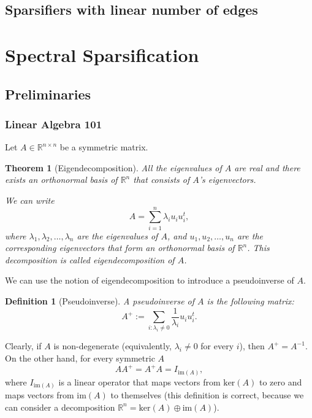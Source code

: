 \documentclass[12pt]{article}
\newtheorem{theorem}{Theorem}
\newtheorem{definition}{Definition}
\begin{document}
    \subsection{Sparsifiers with linear number of edges}
    \cite{BSS09}

    \section{Spectral Sparsification}

    \subsection{Preliminaries}

    \subsubsection{Linear Algebra 101}

    Let $A \in \mathbb{R}^{n \times n}$ be a symmetric matrix. 
    \begin{theorem}[Eigendecomposition]
        All the eigenvalues
        of $A$ are real and there exists an orthonormal basis of $\mathbb{R}^n$
        that consists of $A$'s eigenvectors.

        We can write
        $$
            A = \sum_{i=1}^n \lambda_i u_i u_i^t,
        $$
        where $\lambda_1, \lambda_2, \ldots, \lambda_n$ are the eigenvalues of $A$, and
        $u_1, u_2, \ldots, u_n$ are the corresponding eigenvectors that form an orthonormal
        basis of $\mathbb{R}^n$. This decomposition is called \emph{eigendecomposition}
        of $A$.
    \end{theorem}

    We can use the notion of eigendecomposition to introduce a pseudoinverse of $A$.

    \begin{definition}[Pseudoinverse]
        A \emph{pseudoinverse} of $A$ is the following matrix:
        $$
            A^+ := \sum_{i : \lambda_i \ne 0} \frac{1}{\lambda_i} u_i u_i^t.
        $$
    \end{definition}

    Clearly, if $A$ is non-degenerate (equivalently, $\lambda_i \ne 0$ for every $i$),
    then $A^+ = A^{-1}$.
    On the other hand, for every symmetric $A$
    $$
        A A^+ = A^+ A = I_{\mathrm{im}(A)},
    $$
    where $I_{\mathrm{im}(A)}$ is a linear operator that maps vectors from $\mathrm{ker}(A)$
    to zero and maps vectors from $\mathrm{im}(A)$ to themselves (this definition is correct,
    because we can consider a decomposition
    $\mathbb{R}^n = \mathrm{ker}(A) \oplus \mathrm{im}(A)$).
\end{document}
